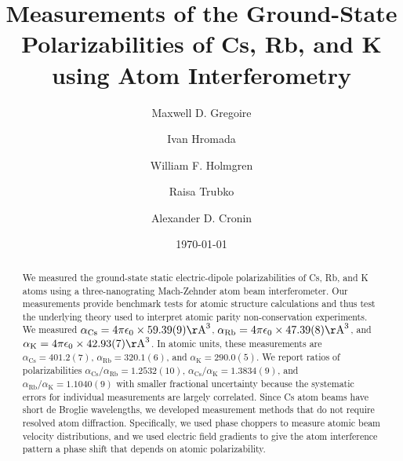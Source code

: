 \documentclass[twocolumn,pra,showpacs,superscriptaddress,longbibliography]{revtex4-1}   %
\newcommand{\ak}{\alpha_{\textrm{K}}}
\newcommand{\arb}{\alpha_{\textrm{Rb}}}
\newcommand{\acs}{\alpha_{\textrm{Cs}}}
\newcommand{\polKSysOnly}{42.93(7)}
\newcommand{\polRbSysOnly}{47.39(8)}
\newcommand{\polCsSysOnly}{59.39(9)}
\newcommand{\ratRbK}{1.1040(9)}
\newcommand{\ratCsK}{1.3834(9)}
\newcommand{\ratCsRb}{1.2532(10)}
\newcommand{\AAA}{\mathrm{\AA}}
\begin{document}
\title{Measurements of the Ground-State Polarizabilities of Cs, Rb, and K using Atom Interferometry}

\author{Maxwell D. Gregoire}
\author{Ivan Hromada}
\author{William F. Holmgren}
\author{Raisa Trubko}
\author{Alexander D. Cronin}

\date{\today}





\begin{abstract}
We measured the ground-state static electric-dipole polarizabilities of Cs, Rb, and K atoms using a three-nanograting Mach-Zehnder atom beam interferometer. Our measurements provide benchmark tests for atomic structure calculations and thus test the underlying theory used to interpret atomic parity non-conservation experiments.
We measured $\acs = 4\pi\epsilon_0 \times \polCsSysOnly \AAA^3$, $\arb = 4\pi\epsilon_0 \times \polRbSysOnly \AAA^3$, and $\ak = 4\pi\epsilon_0 \times \polKSysOnly \AAA^3$. In atomic units, these measurements are $\acs = 401.2(7)$, $\arb = 320.1(6)$, and $\ak = 290.0(5)$. We report ratios of polarizabilities $\acs/\arb = \ratCsRb$, $\acs/\ak = \ratCsK$, and $\arb/\ak = \ratRbK$ with smaller fractional uncertainty because the systematic errors for individual measurements are largely correlated. 
Since Cs atom beams have short de Broglie wavelengths, we developed measurement methods that do not require resolved atom diffraction.
Specifically, we used phase choppers to measure atomic beam velocity distributions, and we used electric field gradients to give the atom interference pattern a phase shift that depends on atomic polarizability.
\end{abstract}
\end{document}

